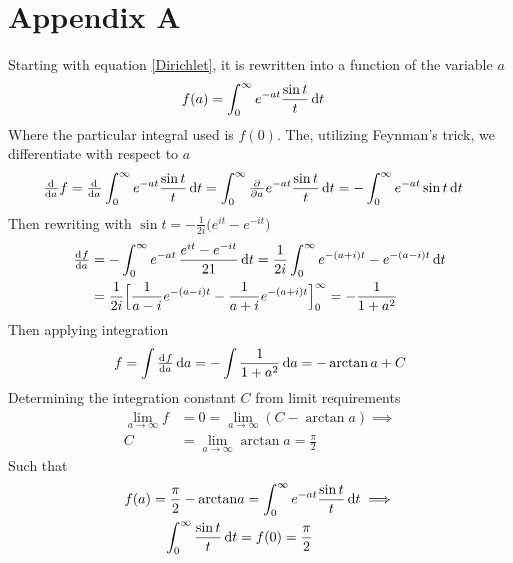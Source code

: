 \documentclass{memoir}
\begin{document}
\section*{Appendix A}
\label{DirProof}
Starting with equation \ref{Dirichlet}, it is rewritten into a function of the variable $a$
\begin{align*}
	f(a)&=\int_{0}^{\infty}e^{-at}\frac{\sin t}{t}\dif t
\end{align*}
Where the particular integral used is $f(0)$.
The, utilizing Feynman's trick, we differentiate with respect to $a$
\begin{align*}
	\od{}{a}f&=\od{}{a}\int_{0}^{\infty} e^{-at}\frac{\sin t}{t}\dif t = \int_{0}^{\infty} \pd{}{a}e^{-at}\frac{\sin t}{t}\dif t = -\int_{0}^{\infty} e^{-at}\sin t \dif t
\end{align*}
Then rewriting with $\sin t = -\frac{1}{2i}\big(e^{it}-e^{-it}\big)$
\begin{align*}
	\od{f}{a}&=-\int_{0}^{\infty}e^{-at} \,\frac{e^{it}-e^{-it}}{21}\dif t=\frac{1}{2i}\int_{0}^{\infty}e^{-(a+i)t}-e^{-(a-i)t}\dif t\\
	&= \frac{1}{2i}\Big[ \frac{1}{a-i}e^{-(a-i)t}-\frac{1}{a+i}e^{-(a+i)t}  \Big]_0^{\infty}=-\frac{1}{1+a^2}
\end{align*}
Then applying integration
\begin{align*}
	f=\int \od{f}{a}\dif a=-\int \frac{1}{1+a^2}\dif a=-\arctan a + C
\end{align*}
Determining the integration constant $C$ from limit requirements
\begin{align*}
	\lim_{a\rightarrow \infty}f&=0=\lim_{a\rightarrow \infty}(C-\arctan a)\implies\\
	C&=\lim_{a\rightarrow \infty}\arctan a = \frac{\pi}{2}
\end{align*}
Such that
\begin{align*}
	f(a)= \frac{\pi}{2}-\arctan &a = \int_{0}^{\infty}e^{-at}\frac{\sin t}{t}\dif t\implies\\
	\int_{0}^{\infty}\frac{\sin t}{t}\dif t &= f(0) = \frac{\pi}{2}
\end{align*}
\end{document}
